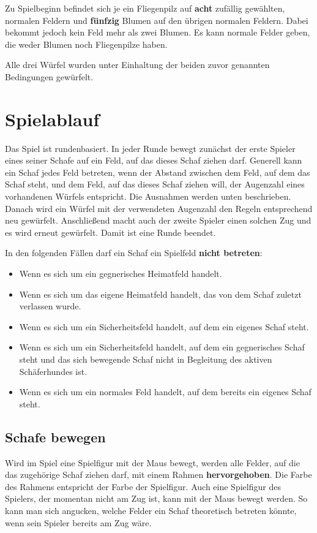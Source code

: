 \documentclass[11pt,pointlessnumbers,DIV10,BCOR10mm,tocleft]{scrreprt}
\begin{document}
Zu Spielbeginn befindet sich je ein Fliegenpilz auf \textbf{acht} zufällig gewählten, normalen Feldern und \textbf{fünfzig} Blumen auf den übrigen normalen Feldern. Dabei bekommt jedoch kein Feld mehr als zwei Blumen. Es kann normale Felder geben, die weder Blumen noch Fliegenpilze haben.

Alle drei Würfel wurden unter Einhaltung der beiden zuvor genannten Bedingungen gewürfelt.

\section{Spielablauf}
Das Spiel ist rundenbasiert. In jeder Runde bewegt zunächst der erste Spieler eines seiner Schafe auf ein Feld, auf das dieses Schaf ziehen darf. Generell kann ein Schaf jedes Feld betreten, wenn der Abstand zwischen dem Feld, auf dem das Schaf steht, und dem Feld, auf das dieses Schaf ziehen will, der Augenzahl eines vorhandenen Würfels entspricht. Die Ausnahmen werden unten beschrieben. Danach wird ein Würfel mit der verwendeten Augenzahl den Regeln entsprechend neu gewürfelt. Anschließend macht auch der zweite Spieler einen solchen Zug und es wird erneut gewürfelt. Damit ist eine Runde beendet.

In den folgenden Fällen darf ein Schaf ein Spielfeld \textbf{nicht betreten}:

\begin{itemize}
\item Wenn es sich um ein gegnerisches Heimatfeld handelt.
\item Wenn es sich um das eigene Heimatfeld handelt, das von dem Schaf zuletzt verlassen wurde.

\item Wenn es sich um ein Sicherheitsfeld handelt, auf dem ein eigenes Schaf steht.
\item Wenn es sich um ein Sicherheitsfeld handelt, auf dem ein gegnerisches Schaf steht und das sich bewegende Schaf nicht in Begleitung des aktiven Schäfer\-hundes ist.

\item Wenn es sich um ein normales Feld handelt, auf dem bereits ein eigenes Schaf steht.
\end{itemize}

\subsection{Schafe bewegen}

Wird im Spiel eine Spielfigur mit der Maus bewegt, werden alle Felder, auf die das zugehörige Schaf ziehen darf, mit einem Rahmen \textbf{hervorgehoben}. Die Farbe des Rahmens entspricht der Farbe der Spielfigur. Auch eine Spielfigur des Spielers, der momentan nicht am Zug ist, kann mit der Maus bewegt werden. So kann man sich angucken, welche Felder ein Schaf theoretisch betreten könnte, wenn sein Spieler bereits am Zug wäre.
\end{document}
